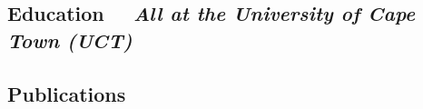 \documentclass[10pt]{article}
\begin{document}


\subsection*{Education %
  ~~{\small \textmd{\textit{All at the University of Cape Town (UCT)}}}}



\subsection*{Publications} %



\hrulefill
\end{document}
